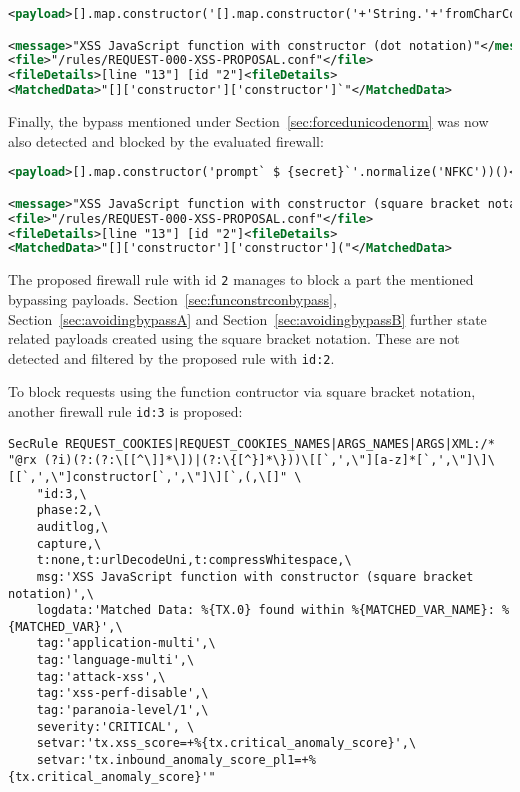 \begin{lstlisting}[style=ruleStyle, language=XML, caption=fromCharCode() bypass blocked]
<payload>[].map.constructor('[].map.constructor('+'String.'+'fromCharCode(0x61,108,0x65,114,116,0x28,96,120,115,115,0x60,0x29)'+')();')();</payload>

<message>"XSS JavaScript function with constructor (dot notation)"</message>
<file>"/rules/REQUEST-000-XSS-PROPOSAL.conf"</file>
<fileDetails>[line "13"] [id "2"]<fileDetails>
<MatchedData>"[]['constructor']['constructor']`"</MatchedData>
\end{lstlisting}

Finally, the bypass mentioned under Section~\ref{sec:forcedunicodenorm} was now also detected and blocked by the evaluated firewall:

\begin{lstlisting}[style=ruleStyle, language=XML, caption=Forced unicode normalization bypass blocked]
<payload>[].map.constructor('prompt` $ {secret}`'.normalize('NFKC'))()</payload>

<message>"XSS JavaScript function with constructor (square bracket notation)"</message>
<file>"/rules/REQUEST-000-XSS-PROPOSAL.conf"</file>
<fileDetails>[line "13"] [id "2"]<fileDetails>
<MatchedData>"[]['constructor']['constructor']("</MatchedData>
\end{lstlisting}

The proposed firewall rule with id \verb|2| manages to block a part the mentioned bypassing payloads. Section~\ref{sec:funconstrconbypass}, Section~\ref{sec:avoidingbypassA} and Section~\ref{sec:avoidingbypassB} further state related payloads created using the square bracket notation. These are not detected and filtered by the proposed rule with \verb|id:2|.

To block requests using the function contructor via square bracket notation, another firewall rule \verb|id:3| is proposed:

\begin{lstlisting}[style=basicStyle, caption=rule proposal to block usage of Function() constructor in square bracket notation, label={lst:constructorsruleproposalB}]
SecRule REQUEST_COOKIES|REQUEST_COOKIES_NAMES|ARGS_NAMES|ARGS|XML:/* "@rx (?i)(?:(?:\[[^\]]*\])|(?:\{[^}]*\}))\[[`,',\"][a-z]*[`,',\"]\]\[[`,',\"]constructor[`,',\"]\][`,(,\[]" \
    "id:3,\
    phase:2,\
    auditlog,\
    capture,\
    t:none,t:urlDecodeUni,t:compressWhitespace,\
    msg:'XSS JavaScript function with constructor (square bracket notation)',\
    logdata:'Matched Data: %{TX.0} found within %{MATCHED_VAR_NAME}: %{MATCHED_VAR}',\
    tag:'application-multi',\
    tag:'language-multi',\
    tag:'attack-xss',\
    tag:'xss-perf-disable',\
    tag:'paranoia-level/1',\
    severity:'CRITICAL', \
    setvar:'tx.xss_score=+%{tx.critical_anomaly_score}',\
    setvar:'tx.inbound_anomaly_score_pl1=+%{tx.critical_anomaly_score}'"
\end{lstlisting}

